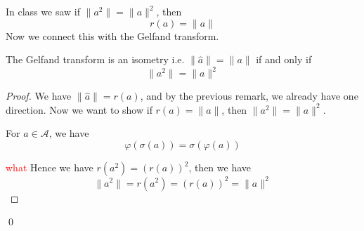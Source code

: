 In class we saw if $\|a^2\|=\|a\|^2$, then 
\begin{equation*}
    r(a)=\|a\|
\end{equation*}
Now we connect this with the Gelfand transform.
\begin{proposition}
    The Gelfand transform is an isometry i.e. $\|\widehat{a}\|=\|a\|$ if and only if 
    \begin{equation*}
        \|a^2\|=\|a\|^2
    \end{equation*}
\end{proposition}
\begin{proof}
    We have $\|\widehat{a}\|=r(a)$, and by the previous remark, we already have one direction. Now we want to show if $r(a)=\|a\|$, then $\|a^2\|=\|a\|^2$.
    \begin{lemma}
        For $a\in\mathcal{A}$, we have
        \begin{equation*}
            \varphi(\sigma(a))=\sigma(\varphi(a))
        \end{equation*}
    \end{lemma}
    \textcolor{red}{what}
    Hence we have $r(a^2)=(r(a))^2$, then we have
    \begin{equation*}
        \|a^2\|=r(a^2)=(r(a))^2=\|a\|^2
    \end{equation*}
\end{proof}
\qed



